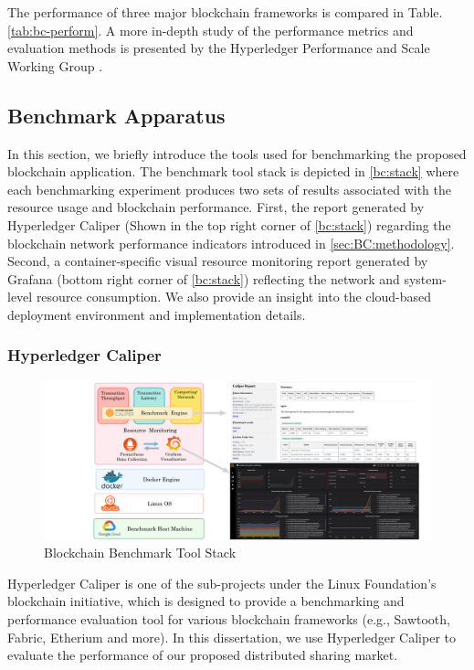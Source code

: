 The performance of three major blockchain frameworks is compared in Table. \ref{tab:bc-perform}.
A more in-depth study of the performance metrics and evaluation methods is presented by the Hyperledger Performance and Scale Working Group  \cite{hgperf,pswg}.


\subsection{Benchmark Apparatus}
In this section, we briefly introduce the tools used for benchmarking the proposed blockchain application. The benchmark tool stack is depicted in \autoref{bc:stack} where each benchmarking experiment produces two sets of results associated with the resource usage and blockchain performance. First, the report generated by Hyperledger Caliper (Shown in the top right corner of \autoref{bc:stack}) regarding the blockchain network performance indicators introduced in \autoref{sec:BC:methodology}. Second, a container-specific visual resource monitoring report generated by Grafana (bottom right corner of \autoref{bc:stack}) reflecting the network and system-level resource consumption. We also provide an insight into the cloud-based deployment environment and implementation details.

\subsubsection{Hyperledger Caliper}
\begin{figure}
\centering
\includegraphics[width=\linewidth]{Figures/BC-Bench.pdf}
\caption{Blockchain Benchmark Tool Stack}
\label{bc:stack}
\end{figure}

Hyperledger Caliper \cite{caliper} is one of the sub-projects under the Linux Foundation's blockchain initiative, which is designed to provide a benchmarking and performance evaluation tool for various blockchain frameworks (e.g., Sawtooth, Fabric, Etherium and more). 
In this dissertation, we use Hyperledger Caliper to evaluate the performance of our proposed distributed sharing market.

